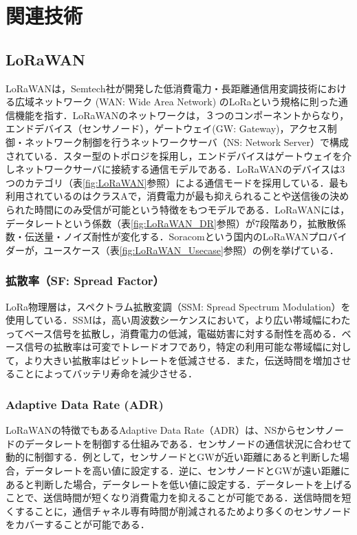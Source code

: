 \chapter{関連技術}

\section{LoRaWAN}
LoRaWANは，Semtech社が開発した低消費電力・長距離通信用変調技術における広域ネットワーク (WAN: Wide Area Network) のLoRaという規格に則った通信機能を指す．LoRaWANのネットワークは，３つのコンポーネントからなり，エンドデバイス（センサノード），ゲートウェイ(GW: Gateway)，アクセス制御・ネットワーク制御を行うネットワークサーバ（NS: Network Server）で構成されている．スター型のトポロジを採用し，エンドデバイスはゲートウェイを介しネットワークサーバに接続する通信モデルである．LoRaWANのデバイスは3つのカテゴリ（表\ref{fig:LoRaWAN}参照）による通信モードを採用している．最も利用されているのはクラスAで，消費電力が最も抑えられることや送信後の決められた時間にのみ受信が可能という特徴をもつモデルである．LoRaWANには，データレートという係数（表\ref{fig:LoRaWAN_DR}参照）が7段階あり，拡散散係数・伝送量・ノイズ耐性が変化する．Soracomという国内のLoRaWANプロバイダーが，ユースケース（表\ref{fig:LoRaWAN_Usecase}参照）の例を挙げている\cite{lorawanbysoracom}．

\subsection{拡散率（SF: Spread Factor）}
LoRa物理層は，スペクトラム拡散変調（SSM: Spread Spectrum Modulation）を使用している．SSMは，高い周波数シーケンスにおいて，より広い帯域幅にわたってベース信号を拡散し，消費電力の低減，電磁妨害に対する耐性を高める．ベース信号の拡散率は可変でトレードオフであり，特定の利用可能な帯域幅に対して，より大きい拡散率はビットレートを低減させる．また，伝送時間を増加させることによってバッテリ寿命を減少させる．

\subsection{Adaptive Data Rate (ADR)}
LoRaWANの特徴でもあるAdaptive Data Rate（ADR）は、NSからセンサノードのデータレートを制御する仕組みである．センサノードの通信状況に合わせて動的に制御する．例として，センサノードとGWが近い距離にあると判断した場合，データレートを高い値に設定する．逆に、センサノードとGWが遠い距離にあると判断した場合，データレートを低い値に設定する．データレートを上げることで、送信時間が短くなり消費電力を抑えることが可能である．送信時間を短くすることに，通信チャネル専有時間が削減されるためより多くのセンサノードをカバーすることが可能である．

